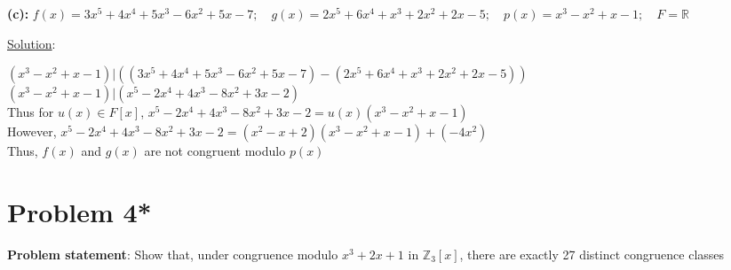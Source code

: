 \documentclass{article} %
\begin{document}
\textbf{(c): } $f(x) = 3x^5 + 4x^4 + 5x^3 - 6x^2 + 5x - 7; \quad  g(x) = 2x^5 + 6x^4 + x^3 + 2x^2 + 2x -5; \quad p(x) =x^3 - x^2 + x - 1; \quad F = \mathbb{R}$
\begin{addmargin}[1em]{0em}
\underline{Solution}: 
\begin{addmargin}[1em]{0em}
$(x^3 - x^2 + x - 1) | ((3x^5 + 4x^4 + 5x^3 - 6x^2 + 5x - 7) - (2x^5 + 6x^4 + x^3 + 2x^2 + 2x -5))$
\\$(x^3 - x^2 + x - 1) | (x^5 - 2x^4 + 4x^3 - 8x^2 + 3x - 2)$
\\Thus for $u(x) \in F[x]$, $x^5 - 2x^4 + 4x^3 - 8x^2 + 3x - 2 = u(x)(x^3 - x^2 + x - 1)$
\\However, $x^5 - 2x^4 + 4x^3 - 8x^2 + 3x - 2 = (x^2 - x + 2)(x^3 - x^2 + x - 1) + (-4x^2)$
\\Thus, $f(x)$ and $g(x)$ are not congruent modulo $p(x)$
\end{addmargin}
\end{addmargin}    

\newpage

\section*{Problem 4*}

\textbf{Problem statement}: Show that, under congruence modulo $x^3 + 2x + 1$ in $\mathbb{Z}_3[x]$, there are exactly 27 distinct congruence classes
\\
\end{document}
